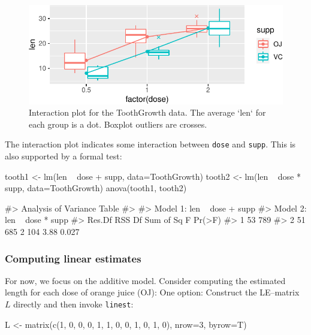 \begin{Schunk}
\begin{figure}
\includegraphics[keepaspectratio]{fig/doby-linear:interaction2-1} \caption[Interaction plot for the ToothGrowth data]{Interaction plot for the ToothGrowth data. The average `len` for each group is a dot. Boxplot outliers are crosses.}\label{fig:linear:interaction2}
\end{figure}
\end{Schunk}

The interaction plot indicates some interaction between \texttt{dose}
and \texttt{supp}. This is also supported by a formal test:

\begin{Schunk}
\begin{Sinput}
tooth1 <- lm(len ~ dose + supp, data=ToothGrowth)
tooth2 <- lm(len ~ dose * supp, data=ToothGrowth)
anova(tooth1, tooth2)
\end{Sinput}
\begin{Soutput}
#> Analysis of Variance Table
#> 
#> Model 1: len ~ dose + supp
#> Model 2: len ~ dose * supp
#>   Res.Df RSS Df Sum of Sq    F Pr(>F)
#> 1     53 789                         
#> 2     51 685  2       104 3.88  0.027
\end{Soutput}
\end{Schunk}

\hypertarget{computing-linear-estimates}{%
\subsubsection{Computing linear
estimates}\label{computing-linear-estimates}}

For now, we focus on the additive model. Consider computing the
estimated length for each dose of orange juice (OJ): One option:
Construct the LE--matrix \(L\) directly and then invoke \texttt{linest}:

\begin{Schunk}
\begin{Sinput}
L <- matrix(c(1, 0, 0, 0, 
              1, 1, 0, 0,
              1, 0, 1, 0), nrow=3, byrow=T)
\end{Sinput}
\end{Schunk}

